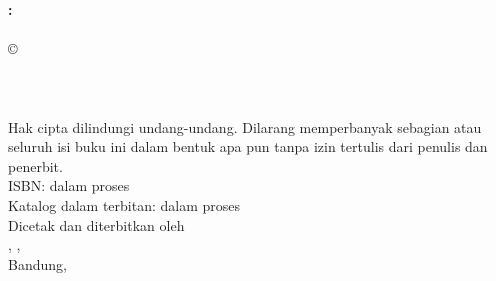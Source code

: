 
\thispagestyle{empty}

\vspace*{\fill}

\begin{flushleft}
{\bfseries \BookTitle: \BookSubtitle}\\[2mm]
\BookEdition\\[6mm]

\copyright\ \BookYear\ \BookAuthor\\[2mm]
\BookProgram\\
\BookFaculty\\
\BookInstitution\\[6mm]

Hak cipta dilindungi undang-undang. Dilarang memperbanyak sebagian
atau seluruh isi buku ini dalam bentuk apa pun tanpa izin tertulis
dari penulis dan penerbit.\\[6mm]

ISBN: dalam proses\\[2mm]
Katalog dalam terbitan: dalam proses\\[6mm]

Dicetak dan diterbitkan oleh\\
\BookProgram, \BookFaculty, \BookInstitution\\[2mm]
Bandung, \BookYear
\end{flushleft}

\vspace*{\fill}
